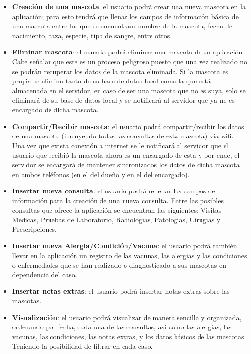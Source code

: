 \begin{itemize}
\item \textbf{ Creación de una mascota}: el usuario podrá crear una nueva mascota en la aplicación; para esto tendrá que llenar los campos de información básica de una mascota entre los que se encuentran: nombre de la mascota, fecha de nacimiento, raza, especie, tipo de sangre, entre otros.
\item \textbf{ Eliminar mascota}: el usuario podrá eliminar una mascota de su aplicación. Cabe señalar que este es un proceso peligroso puesto que una vez realizado no se podrán recuperar los datos de la mascota eliminada. Si la mascota es propia se elimina tanto de su base de datos local como la que está almacenada en el servidor, en caso de ser una mascota que no es suya, solo se eliminará de su base de datos local y se notificará al servidor que ya no es encargado de dicha mascota.
\item \textbf{ Compartir/Recibir mascota}: el usuario podrá compartir/recibir los datos de una mascota (incluyendo todas las consultas de esta mascota) vía wifi. Una vez que exista conexión a internet se le notificará al servidor que el usuario que recibió la mascota ahora es un encargado de esta y por ende, el servidor se encargará de mantener sincronizados los datos de dicha mascota en ambos teléfonos (en el del dueño y en el del encargado).
\item \textbf{ Insertar nueva consulta}: el usuario podrá rellenar los campos de información para la creación de una nueva consulta. Entre las posibles consultas que ofrece la aplicación se encuentran las siguientes: Visitas Médicas, Pruebas de Laboratorio, Radiologías, Patologías, Cirugías y Prescripciones.
\item \textbf{ Insertar nueva Alergia/Condición/Vacuna}: el usuario podrá también llevar en la aplicación un registro de las vacunas, las alergias y las condiciones o enfermedades que se han realizado o diagnosticado a sus mascotas en dependencia del caso.
\item \textbf{ Insertar notas extras}: el usuario podrá insertar notas extras sobre las mascotas.
\item \textbf{ Visualización}: el usuario podrá visualizar de manera sencilla y organizada, ordenando por fecha, cada una de las consultas, así como las alergias, las vacunas, las condiciones, las notas extras, y los datos básicos de las mascotas. Teniendo la posibilidad de filtrar en cada caso.
\end{itemize}


